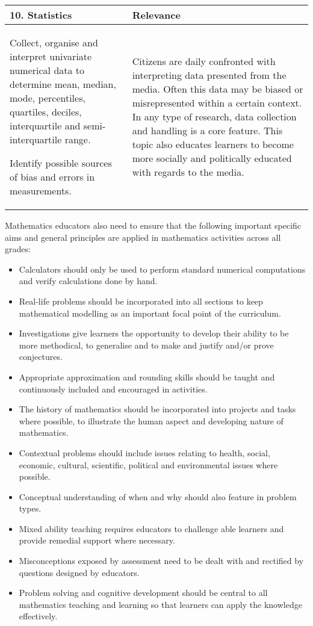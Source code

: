 \begin{table}[H]
 \begin{center} 
\begin{tabular}{|p{8.5cm}|p{3.5cm}|} \hline
\textbf{10. Statistics}& \textbf{Relevance}\\ \hline  

Collect, organise and interpret univariate numerical data to determine mean, median, mode, percentiles, quartiles, deciles, interquartile and semi-interquartile range.\par
Identify possible sources of bias and errors in measurements.
& Citizens are daily confronted with interpreting data presented from the media. Often this data may be biased or misrepresented within a certain context. In any type of research, data collection and handling is a core feature. This topic also educates learners to become more socially and politically educated with regards to the media.
\\ \hline

 \end{tabular}
\end{center}
\end{table}

Mathematics educators also need to ensure that the following important specific aims and general principles are applied in mathematics activities across all grades:
\begin{itemize}[noitemsep]
\item Calculators should only be used to perform standard numerical computations and verify calculations done by hand.
\item Real-life problems should be incorporated into all sections to keep mathematical modelling as an important focal point of the curriculum.
\item Investigations give learners the opportunity to develop their ability to be more methodical, to generalise and to make and justify and/or prove conjectures.
\item Appropriate approximation and rounding skills should be taught and continuously included and encouraged in activities.
\item The history of mathematics should be incorporated into projects and tasks where possible, to illustrate the human aspect and developing nature of mathematics. 
\item Contextual problems should include issues relating to health, social, economic, cultural, scientific, political and environmental issues where possible. 
\item Conceptual understanding of when and why should also feature in problem types.
\item Mixed ability teaching requires educators to challenge able learners and provide remedial support where necessary. 
\item Misconceptions exposed by assessment need to be dealt with and rectified by questions designed by educators. 
\item Problem solving and cognitive development should be central to all mathematics teaching and learning so that learners can apply the knowledge effectively. 
\end{itemize}

